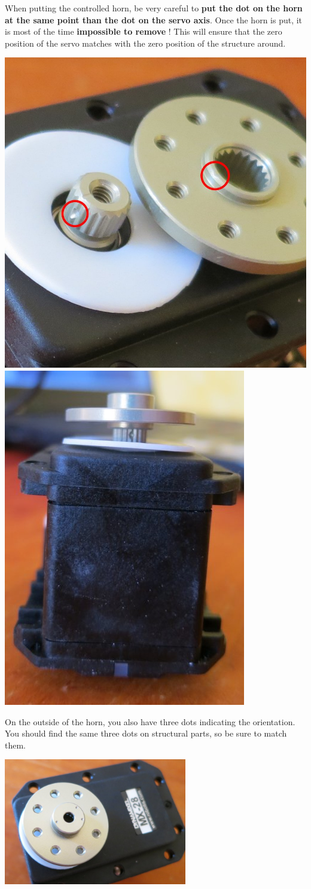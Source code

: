 \documentclass[includefoot]{article}
\begin{document}
When putting the controlled horn, be very careful to \textbf{put the dot on the horn at the same point than the dot on the servo axis}. Once the horn is put, it is most of the time \textbf{impossible to remove} ! This will ensure that the zero position of the servo matches with the zero position of the structure around.

 \begin{center}
  \includegraphics[height=0.5\textwidth]{img/zero}
  \includegraphics[height=0.5\textwidth]{img/zero2}
 \end{center}

On the outside of the horn, you also have three dots indicating the orientation. You should find the same three dots on structural parts, so be sure to match them.

 \begin{center}
  \includegraphics[width=0.6\textwidth]{img/zero3}
 \end{center}
\end{document}

